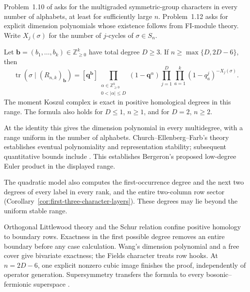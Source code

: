 Problem~1.10 of \cite{ChurchEllenbergFarb2015} asks for the
multigraded symmetric-group characters in every number of alphabets,
at least for sufficiently large $n$.  Problem~1.12 asks for explicit
dimension polynomials whose existence follows from FI-module theory.
Write $X_j(\sigma)$ for the number of $j$-cycles of $\sigma\in S_n$.

\begin{maintheorem}
\label{thm:intro-full-characters}
Let $\mathbf b=(b_1,\ldots,b_k)\in\mathbb Z_{\ge0}^k$ have total degree $D\ge3$.
If $n\ge\max\{D,2D-6\}$, then
\begin{equation}\label{eq:intro-full-character}
 \operatorname{tr}\!\left(\sigma\mid(R_{n,k})_{\mathbf b}\right)
 = [\mathbf q^{\mathbf b}]
   \prod_{\substack{\alpha\in\mathbb Z_{\ge0}^k\\0<|\alpha|\le D}}
        (1-\mathbf q^\alpha)
   \prod_{j=1}^{D}\prod_{a=1}^{k}
                         (1-q_a^j)^{-X_j(\sigma)}.
\end{equation}
The moment Koszul complex is exact in positive homological degrees
in this range.  The formula also holds for $D\le1$, $n\ge1$,
and for $D=2$, $n\ge2$.
\end{maintheorem}

At the identity this gives the dimension polynomial in every
multidegree, with a range uniform in the number of alphabets.
Church--Ellenberg--Farb's theory establishes
eventual polynomiality and representation stability; subsequent
quantitative bounds include \cite{Bahran2024,Borisov2026}.
This establishes Bergeron's proposed low-degree Euler product
\cite[Section~4, equation~(33)]{Bergeron2013} in the displayed range.

The quadratic model also computes the first-occurrence degree and
the next two degrees of every label in every rank, and the entire two-column row sector
(Corollary~\ref{cor:first-three-character-layers}). These degrees
may lie beyond the uniform stable range.

Orthogonal Littlewood theory \cite{SSW2013} and the Schur relation
confine positive homology to boundary rows. Exactness in the first
possible degree removes an entire boundary before any case calculation. Wang's dimension polynomial
\cite[Theorem~5.1]{Wang2026Polynomiality} and a free cover give bivariate
exactness; the Fields character treats row hooks. At $n=2D-6$,
one explicit nonzero cubic image finishes the proof, independently
of operator generation. Supersymmetry transfers the formula to every
bosonic--fermionic superspace \cite{Lentfer}.

